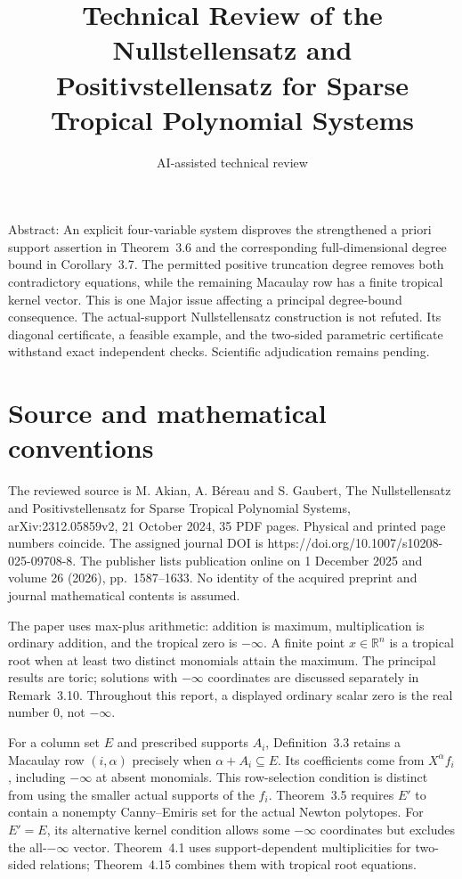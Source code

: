 \documentclass[10pt]{article}
\title{Technical Review of the Nullstellensatz and
Positivstellensatz for Sparse Tropical
Polynomial Systems}
\author{AI-assisted technical review}
\date{}
\begin{document}
\maketitle
Abstract: An explicit four-variable system disproves the strengthened a priori support assertion in Theorem 3.6 and the corresponding full-dimensional degree bound in Corollary 3.7. The permitted positive truncation degree removes both contradictory equations, while the remaining Macaulay row has a finite tropical kernel vector. This is one Major issue affecting a principal degree-bound consequence. The actual-support Nullstellensatz construction is not refuted. Its diagonal certificate, a feasible example, and the two-sided parametric certificate withstand exact independent checks. Scientific adjudication remains pending.\par
\section*{Source and mathematical conventions}
The reviewed source is M. Akian, A. Béreau and S. Gaubert, The Nullstellensatz and Positivstellensatz for Sparse Tropical Polynomial Systems, arXiv:2312.05859v2, 21 October 2024, 35 PDF pages. Physical and printed page numbers coincide. The assigned journal DOI is https://doi.org/10.1007/s10208-025-09708-8. The publisher lists publication online on 1 December 2025 and volume 26 (2026), pp. 1587–1633. No identity of the acquired preprint and journal mathematical contents is assumed.\par
The paper uses max-plus arithmetic: addition is maximum, multiplication is ordinary addition, and the tropical zero is \(-\infty\). A finite point \(x\in\mathbb R^n\) is a tropical root when at least two distinct monomials attain the maximum. The principal results are toric; solutions with \(-\infty\) coordinates are discussed separately in Remark 3.10. Throughout this report, a displayed ordinary scalar zero is the real number \(0\), not \(-\infty\).\par
For a column set \(E\) and prescribed supports \(A_i\), Definition 3.3 retains a Macaulay row \((i,\alpha)\) precisely when \(\alpha+A_i\subseteq E\). Its coefficients come from \(X^\alpha f_i\), including \(-\infty\) at absent monomials. This row-selection condition is distinct from using the smaller actual supports of the \(f_i\). Theorem 3.5 requires \(E'\) to contain a nonempty Canny–Emiris set for the actual Newton polytopes. For \(E'=E\), its alternative kernel condition allows some \(-\infty\) coordinates but excludes the all-\(-\infty\) vector. Theorem 4.1 uses support-dependent multiplicities for two-sided relations; Theorem 4.15 combines them with tropical root equations.\par
\end{document}
